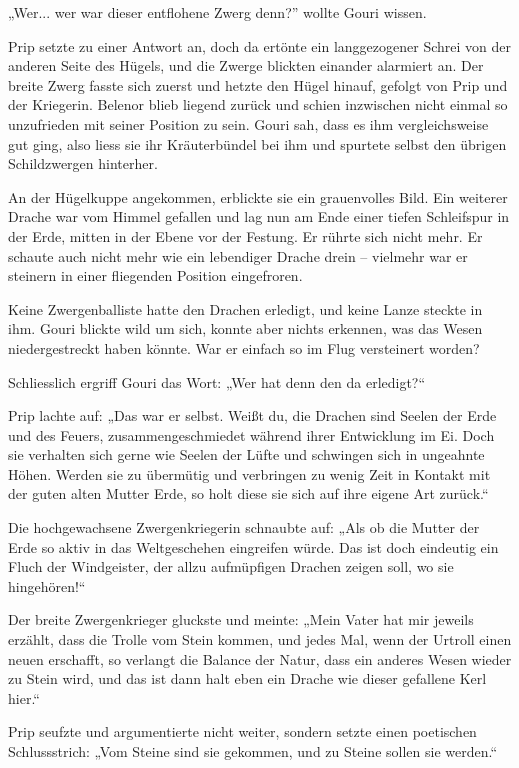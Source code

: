 „Wer... wer war dieser entflohene Zwerg denn?” wollte Gouri wissen.

Prip setzte zu einer Antwort an, doch da ertönte ein langgezogener Schrei von der anderen Seite des Hügels, und die Zwerge blickten einander alarmiert an. Der breite Zwerg fasste sich zuerst und hetzte den Hügel hinauf, gefolgt von Prip und der Kriegerin. Belenor blieb liegend zurück und schien inzwischen nicht einmal so unzufrieden mit seiner Position zu sein. Gouri sah, dass es ihm vergleichsweise gut ging, also liess sie ihr Kräuterbündel bei ihm und spurtete selbst den übrigen Schildzwergen hinterher.

An der Hügelkuppe angekommen, erblickte sie ein grauenvolles Bild. Ein weiterer Drache war vom Himmel gefallen und lag nun am Ende einer tiefen Schleifspur in der Erde, mitten in der Ebene vor der Festung. Er rührte sich nicht mehr. Er schaute auch nicht mehr wie ein lebendiger Drache drein – vielmehr war er steinern in einer fliegenden Position eingefroren.

Keine Zwergenballiste hatte den Drachen erledigt, und keine Lanze steckte in ihm. Gouri blickte wild um sich, konnte aber nichts erkennen, was das Wesen niedergestreckt haben könnte. War er einfach so im Flug versteinert worden?

Schliesslich ergriff Gouri das Wort: „Wer hat denn den da erledigt?“

Prip lachte auf: „Das war er selbst. Weißt du, die Drachen sind Seelen der Erde und des Feuers, zusammengeschmiedet während ihrer Entwicklung im Ei. Doch sie verhalten sich gerne wie Seelen der Lüfte und schwingen sich in ungeahnte Höhen. Werden sie zu übermütig und verbringen zu wenig Zeit in Kontakt mit der guten alten Mutter Erde, so holt diese sie sich auf ihre eigene Art zurück.“

Die hochgewachsene Zwergenkriegerin schnaubte auf: „Als ob die Mutter der Erde so aktiv in das Weltgeschehen eingreifen würde. Das ist doch eindeutig ein Fluch der Windgeister, der allzu aufmüpfigen Drachen zeigen soll, wo sie hingehören!“

Der breite Zwergenkrieger gluckste und meinte: „Mein Vater hat mir jeweils erzählt, dass die Trolle vom Stein kommen, und jedes Mal, wenn der Urtroll einen neuen erschafft, so verlangt die Balance der Natur, dass ein anderes Wesen wieder zu Stein wird, und das ist dann halt eben ein Drache wie dieser gefallene Kerl hier.“

Prip seufzte und argumentierte nicht weiter, sondern setzte einen poetischen Schlussstrich: „Vom Steine sind sie gekommen, und zu Steine sollen sie werden.“

